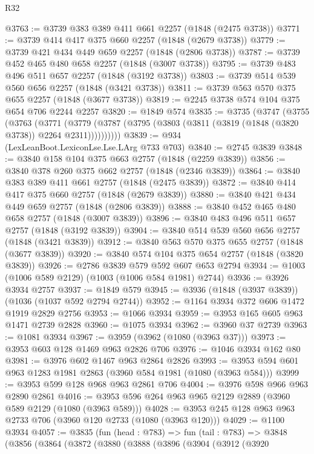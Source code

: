 \begin{lexlean}{R32}
\begin{coremodule}
@3763 := @3739 @383 @389 @411 @661 @2257 (@1848 (@2475 @3738))
@3771 := @3739 @414 @417 @375 @660 @2257 (@1848 (@2679 @3738))
@3779 := @3739 @421 @434 @449 @659 @2257 (@1848 (@2806 @3738))
@3787 := @3739 @452 @465 @480 @658 @2257 (@1848 (@3007 @3738))
@3795 := @3739 @483 @496 @511 @657 @2257 (@1848 (@3192 @3738))
@3803 := @3739 @514 @539 @560 @656 @2257 (@1848 (@3421 @3738))
@3811 := @3739 @563 @570 @375 @655 @2257 (@1848 (@3677 @3738))
@3819 := @2245 @3738 @574 @104 @375 @654 @706 @2244 @2257
@3820 := @1849 @574
@3835 := @3735
    (@3747
      (@3755
        (@3763
          (@3771
            (@3779 (@3787 (@3795 (@3803 (@3811 (@3819 (@1848 (@3820 @3738)) @2264 @2311))))))))))
@3839 := @934 (LexLeanBoot.LexiconLse.Lse.LArg @733 @703)
@3840 := @2745 @3839
@3848 := @3840 @158 @104 @375 @663 @2757 (@1848 (@2259 @3839))
@3856 := @3840 @378 @260 @375 @662 @2757 (@1848 (@2346 @3839))
@3864 := @3840 @383 @389 @411 @661 @2757 (@1848 (@2475 @3839))
@3872 := @3840 @414 @417 @375 @660 @2757 (@1848 (@2679 @3839))
@3880 := @3840 @421 @434 @449 @659 @2757 (@1848 (@2806 @3839))
@3888 := @3840 @452 @465 @480 @658 @2757 (@1848 (@3007 @3839))
@3896 := @3840 @483 @496 @511 @657 @2757 (@1848 (@3192 @3839))
@3904 := @3840 @514 @539 @560 @656 @2757 (@1848 (@3421 @3839))
@3912 := @3840 @563 @570 @375 @655 @2757 (@1848 (@3677 @3839))
@3920 := @3840 @574 @104 @375 @654 @2757 (@1848 (@3820 @3839))
@3926 := @2786 @3839 @579 @592 @607 @653 @2794
@3934 := @1003 (@1006 @589 @2129) (@1003 (@1006 @584 @1981) @2744)
@3936 := @3926 @3934 @2757
@3937 := @1849 @579
@3945 := @3936 (@1848 (@3937 @3839)) (@1036 (@1037 @592 @2794 @2744))
@3952 := @1164 @3934 @372 @606 @1472 @1919 @2829 @2756
@3953 := @1066 @3934
@3959 := @3953 @165 @605 @963 @1471 @2739 @2828
@3960 := @1075 @3934
@3962 := @3960 @37 @2739
@3963 := @1081 @3934
@3967 := @3959 (@3962 (@1080 (@3963 @37)))
@3973 := @3953 @603 @128 @1469 @963 @2826 @706
@3976 := @1046 @3934 @162 @80
@3981 := @3976 @602 @1467 @963 @2864 @2826
@3993 := @3953 @594 @601 @963 @1283 @1981 @2863 (@3960 @584 @1981 (@1080 (@3963 @584)))
@3999 := @3953 @599 @128 @968 @963 @2861 @706
@4004 := @3976 @598 @966 @963 @2890 @2861
@4016 := @3953 @596 @264 @963 @965 @2129 @2889 (@3960 @589 @2129 (@1080 (@3963 @589)))
@4028 := @3953 @245 @128 @963 @963 @2733 @706 (@3960 @120 @2733 (@1080 (@3963 @120)))
@4029 := @1100 @3934
@4057 := @3835
    (fun (head : @783) =>
    fun (tail : @783) =>
    @3848
      (@3856
        (@3864
          (@3872
            (@3880
              (@3888
                (@3896
                  (@3904
                    (@3912
                      (@3920

\end{coremodule}
\end{lexlean}
